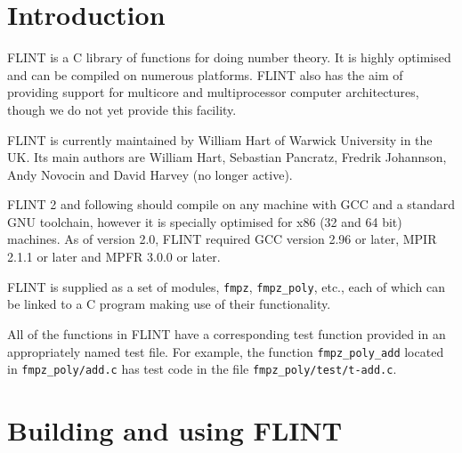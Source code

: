 \documentclass[a4paper,10pt]{book}
\newcommand{\code}{\lstinline}
\begin{document}

\frontmatter


\clearpage

\tableofcontents


\mainmatter

\chapter{Introduction}

FLINT is a C library of functions for doing number theory. It is highly 
optimised and can be compiled on numerous platforms.  FLINT also has the 
aim of providing support for multicore and multiprocessor computer 
architectures, though we do not yet provide this facility.

FLINT is currently maintained by William Hart of Warwick University in 
the UK. Its main authors are William Hart, Sebastian Pancratz, Fredrik
Johannson, Andy Novocin and David Harvey (no longer active).

FLINT 2 and following should compile on any machine with GCC and a standard 
GNU toolchain, however it is specially optimised for x86 (32 and 64 bit)
machines. As of version 2.0, FLINT required GCC version 2.96 or later, 
MPIR 2.1.1 or later and MPFR 3.0.0 or later.

FLINT is supplied as a set of modules, \code{fmpz}, \code{fmpz_poly}, etc., 
each of which can be linked to a C program making use of their functionality.

All of the functions in FLINT have a corresponding test function provided 
in an appropriately named test file.  For example, the function 
\code{fmpz_poly_add} located in \code{fmpz_poly/add.c} has test code in the 
file \code{fmpz_poly/test/t-add.c}.

\chapter{Building and using FLINT}
\end{document}
